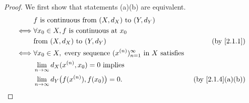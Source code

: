 \begin{proof}
  We first show that statements (a)(b) are equivalent.
  \begin{align*}
         & f \text{ is continuous from } (X, d_X) \text{ to } (Y, d_Y)                                                                           \\
    \iff & \forall x_0 \in X, f \text{ is continuous at } x_0                                                                                    \\
         & \text{from } (X, d_X) \text{ to } (Y, d_Y)                                                           & \text{(by \cref{2.1.1})}       \\
    \iff & \forall x_0 \in X, \text{ every sequence } (x^{(n)})_{n = 1}^\infty \text{ in } X \text{ satisfies }                                  \\
         & \lim_{n \to \infty} d_X(x^{(n)}, x_0) = 0 \text{ implies}                                                                             \\
         & \lim_{n \to \infty} d_Y\big(f(x^{(n)}), f(x_0)\big) = 0.                                             & \text{(by \cref{2.1.4}(a)(b))}
  \end{align*}


\end{proof}
